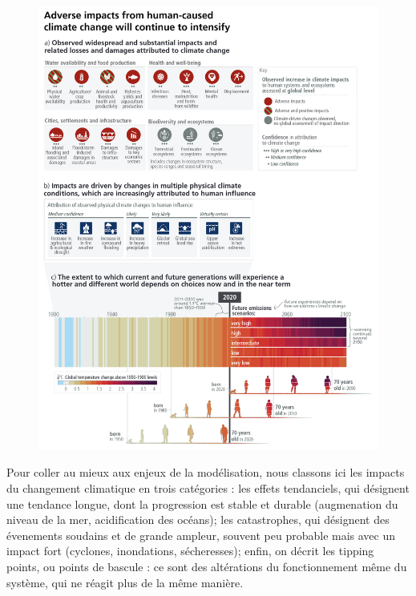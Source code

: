 \begin{figure}
    \centering
    \includegraphics[width=\textwidth]{figures/spm1.png}
    \label{fig:ipcc-impacts}
\end{figure}

Pour coller au mieux aux enjeux de la modélisation, nous classons ici les impacts du changement climatique en trois catégories : les effets tendanciels, qui désignent une tendance longue, dont la progression est stable et durable (augmenation du niveau de la mer, acidification des océans); les catastrophes, qui désignent des évenements soudains et de grande ampleur, souvent peu probable mais avec un impact fort (cyclones, inondations, sécheresses); enfin, on décrit les tipping points, ou points de bascule : ce sont des altérations du fonctionnement même du système, qui ne réagit plus de la même manière. 

